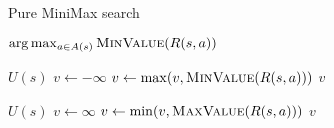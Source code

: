 \begin{algorithm}[H]
    \caption{Pure MiniMax search}
    \label{alg:minimax}
    \begin{algorithmic}[1]
    
        \State \Return $\arg\max_{a \in A(s)} \textproc{MinValue}(R(s, a))$
    \EndProcedure
    \end{algorithmic}

    \begin{algorithmic}[1]

            \Return $U(s)$
        \EndIf
        \State $v \leftarrow -\infty$
            \State $v \leftarrow \max(v, \textproc{MinValue}(R(s, a)))$
        \EndFor
        \State \Return $v$
    \EndProcedure
    
    \end{algorithmic}
        
    \begin{algorithmic}[1]

            \Return $U(s)$
        \EndIf
        \State $v \leftarrow \infty$
            \State $v \leftarrow \min(v, \textproc{MaxValue}(R(s, a)))$
        \EndFor
        \State \Return $v$
    \EndProcedure

    \end{algorithmic}
\end{algorithm}